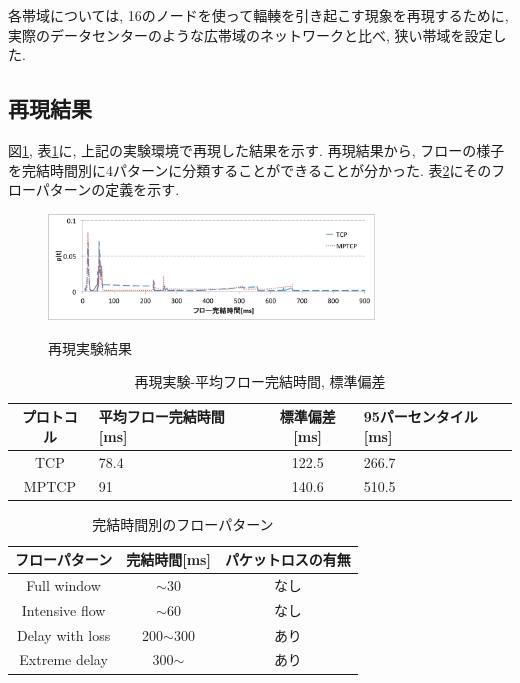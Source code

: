 \documentclass[11pt, a4paper, uplatex]{jsarticle}
\begin{document}
各帯域については, 16のノードを使って輻輳を引き起こす現象を再現するために, 実際のデータセンターのような広帯域のネットワークと比べ,
狭い帯域を設定した.

\subsection{再現結果}
図\ref{fig:short_flow_rep}, 表\ref{table:short_flow_rep}に, 上記の実験環境で再現した結果を示す.
再現結果から, フローの様子を完結時間別に4パターンに分類することができることが分かった.
表\ref{table:flow_pattern}にそのフローパターンの定義を示す.

\begin{figure}[h]
    \begin{center}
    \includegraphics[autoebb, width=245pt]{./img/flow_comp.pdf}
    \caption{再現実験結果}
    \label{fig:short_flow_rep}
    \end{center}
\end{figure}

\begin{table}[h]
\begin{center}
\begin{tabular}{c|p{6em}|c|p{6em}}
\hline
プロトコル & 平均フロー完結時間[ms] & 標準偏差[ms] &
95パーセンタイル[ms] \\
\hline \hline TCP &\hfil 78.4 & 122.5 &\hfil 266.7\\
MPTCP &\hfil 91 & 140.6 &\hfil 510.5\\
\hline
\end{tabular}
\caption{再現実験-平均フロー完結時間, 標準偏差}
\label{table:short_flow_rep}
\end{center}
\end{table}

\begin{table}[h]
\begin{center}
\begin{tabular}{c|c|c}
\hline
フローパターン & 完結時間[ms] & パケットロスの有無 \\ \hline \hline
Full window & $\sim$30 & なし\\
Intensive flow & $\sim$60 & なし\\
Delay with loss & 200$\sim$300 & あり\\
Extreme delay & 300$\sim$ & あり\\
\hline
\end{tabular}
\caption{完結時間別のフローパターン}
\label{table:flow_pattern}
\end{center}
\end{table}
\end{document}
